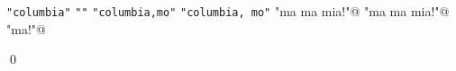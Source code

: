 \begin{tightlist}
\li \verb!"columbia"!
\li \verb!""!
\li \verb!"columbia,mo"!
\li \verb!"columbia, mo"!
\li \verb@"ma ma mia!"@
\li \verb@"ma ma mia!\n"@
\li \verb@"ma\tma\tmia!\n\n"@
\end{tightlist}
\qed
